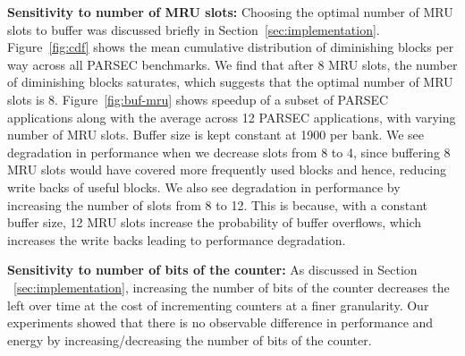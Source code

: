 \noindent\textbf{Sensitivity to number of MRU slots:}
Choosing the optimal number of MRU slots to buffer was discussed briefly in Section~\ref{sec:implementation}.
Figure~\ref{fig:cdf} shows the mean cumulative distribution of diminishing blocks per
way across all PARSEC benchmarks. We find that after 8 MRU slots, the number of diminishing blocks
saturates, which suggests that  the optimal number of MRU slots is 8. Figure~\ref{fig:buf-mru} shows
speedup of a subset of PARSEC applications along with the average across 12 PARSEC applications, with varying
number of MRU slots. Buffer size is kept constant at 1900 per bank. We see degradation in performance when we decrease
slots from 8 to 4, since buffering 8 MRU slots would have covered more frequently used blocks and hence, reducing
write backs of useful blocks.
We also see degradation in performance by increasing the number of slots from 8 to 12.
This is because, with a constant buffer
size, 12 MRU slots increase the probability of buffer overflows, which increases the write backs leading to performance degradation.

\noindent\textbf{Sensitivity to number of bits of the counter:}
As discussed in Section ~\ref{sec:implementation}, increasing the number of bits of the counter decreases the
left over time at the cost of incrementing counters at a finer granularity. Our experiments showed that
there is no observable difference in performance and energy by increasing/decreasing the number of bits of the counter.
